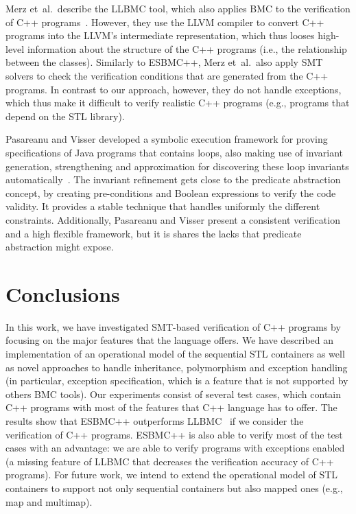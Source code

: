 \documentclass[a4paper]{llncs}
\begin{document}
Merz et~al.\ describe the LLBMC tool, which also applies BMC to the verification
of C++ programs~\cite{Florian12}. However, they use the LLVM compiler to convert C++
programs into the LLVM's intermediate representation, which thus looses high-level
information about the structure of the C++ programs (i.e., the relationship between
the classes). Similarly to ESBMC++, Merz et~al.\ also apply SMT solvers to check the verification
conditions that are generated from the C++ programs. In contrast to our approach, however,
they do not handle exceptions, which thus make it difficult to verify realistic C++ programs
(e.g., programs that depend on the STL library).

Pasareanu and Visser developed a symbolic execution framework
for proving specifications of Java programs that contains loops,
also making use of invariant generation, strengthening and approximation
for discovering these loop invariants automatically~\cite{Pasareanu04}.
The invariant refinement gets close to the predicate abstraction concept,
by creating pre-conditions and Boolean expressions to verify the code validity.
It provides a stable technique that handles uniformly the different constraints.
Additionally, Pasareanu and Visser present a consistent verification and a high
flexible framework, but it is shares the lacks that predicate abstraction might
expose.

\section{Conclusions}

In this work, we have investigated SMT-based verification of C++ programs
by focusing on the major features that the language offers. We have described
an implementation of an operational model of the sequential STL containers
as well as novel approaches to handle inheritance, polymorphism and exception handling
(in particular, exception specification, which is a feature that is not supported by others
BMC tools). Our experiments consist of several test cases, which contain C++ programs
with most of the features that C++ language has to offer. The results show that
ESBMC++ outperforms LLBMC~\cite{Florian12} if we consider the verification of C++ programs.
ESBMC++ is also able to verify most of the test cases with an advantage: we are able to verify programs
with exceptions enabled (a missing feature of LLBMC that decreases the verification accuracy of
C++ programs). For future work, we intend to extend the operational model of STL containers
to support not only sequential containers but also mapped ones (e.g., map and multimap).
\end{document}
